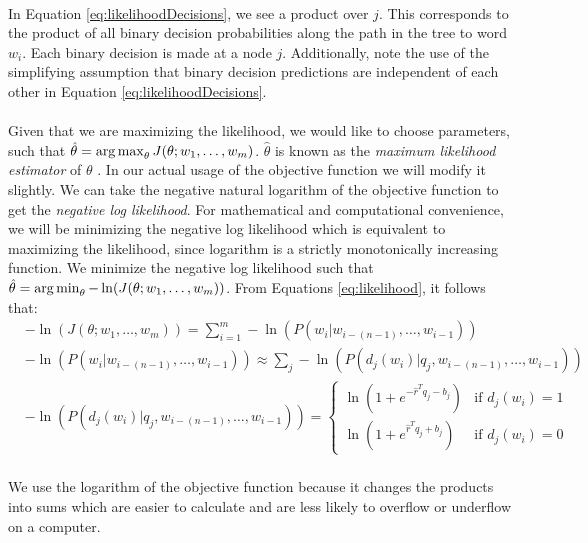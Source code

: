 \paragraph{}
In Equation \ref{eq:likelihoodDecisions}, we see a product over $j$. This corresponds to the product of all binary decision probabilities along the path in the tree to word $w_i$. Each binary decision is made at a node $j$. Additionally, note the use of the simplifying assumption that binary decision predictions are independent of each other in Equation \ref{eq:likelihoodDecisions}.
\paragraph{}
Given that we are maximizing the likelihood, we would like to choose parameters, such that $\hat{\theta} = \operatorname*{arg\,max}_\theta J(\theta;w_1,\dots, w_m)$. $\hat{\theta}$ is known as the \emph{maximum likelihood estimator} of $\theta$ \cite{Elkan2013}.  In our actual usage of the objective function we will modify it slightly. We can take the negative natural logarithm of the objective function to get the \emph{negative log likelihood}. For mathematical and computational convenience, we will be minimizing the negative log likelihood which is equivalent to maximizing the likelihood, since logarithm is a strictly monotonically increasing function\cite{Elkan2013}. We minimize the negative log likelihood such that  $\hat{\theta} = \operatorname*{arg\,min}_\theta -\ln(J(\theta;w_1,\dots, w_m))$.
From Equations \ref{eq:likelihood}, it follows that:
\begin{align}
&-\ln(J(\theta;w_1,\dots, w_m)) = \sum_{i=1}^{m} -\ln(P(w_i | w_{i-(n-1)},\dots, w_{i-1}))
\\
&-\ln(P(w_i | w_{i-(n-1)},\dots, w_{i-1})) \approx \sum_j - \ln(P(d_j(w_i) | q_j, w_{i-(n-1)},\dots, w_{i-1})) 
\\
&- \ln(P(d_j(w_i) | q_j, w_{i-(n-1)},\dots, w_{i-1})) = 
\begin{cases}
  \ln (1 + e^{-\hat{r}^T q_{j} -b_{j}}) 	      & \text{if } d_j(w_i)  = 1 \\
  \ln (1 + e^{\hat{r}^T q_{j} +b_{j}})    & \text{if } d_j(w_i) = 0
  \end{cases} \nonumber
\end{align}

\paragraph{}
We use the logarithm of the objective function because it changes the products into sums which are easier to calculate and are less likely to overflow or underflow on a computer.

